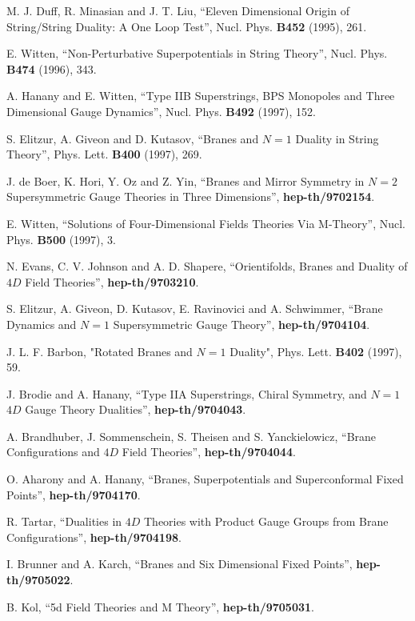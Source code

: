 \begin{thebibliography}{99}
M. J. Duff, R. Minasian and J. T. Liu, ``Eleven Dimensional
Origin of String/String Duality: A One Loop Test'', Nucl. Phys.
{\bf B452} (1995), 261.
  

 E. Witten, ``Non-Perturbative Superpotentials in String Theory'',  
Nucl. Phys. {\bf B474} (1996), 343. 

 A. Hanany and E. Witten, ``Type IIB Superstrings,
BPS Monopoles and Three Dimensional Gauge Dynamics'', Nucl. Phys.
{\bf B492} (1997), 152. 

 S. Elitzur, A. Giveon and D. Kutasov, ``Branes and
$N=1$ Duality in String Theory'', Phys. Lett. {\bf B400} (1997),
269.

 J. de Boer, K. Hori, Y. Oz and Z. Yin, ``Branes
and Mirror Symmetry in $N=2$ Supersymmetric Gauge Theories in
Three Dimensions'', {\bf hep-th/9702154}.

 E. Witten, ``Solutions of Four-Dimensional Fields
Theories Via M-Theory'', Nucl. Phys. {\bf B500} (1997), 3.

 N. Evans, C. V. Johnson and A. D. Shapere,
``Orientifolds, Branes and Duality of $4D$ Field Theories'', 
{\bf hep-th/9703210}.

 S. Elitzur, A. Giveon, D. Kutasov, E. Ravinovici
and A. Schwimmer, ``Brane Dynamics and $N=1$ Supersymmetric Gauge 
Theory'', {\bf hep-th/9704104}.

 J. L. F. Barbon, "Rotated Branes and $N=1$ 
Duality", Phys. Lett. {\bf B402} (1997), 59.

 J. Brodie and A. Hanany, ``Type IIA Superstrings, 
Chiral Symmetry, and $N=1$ $4D$ Gauge Theory Dualities'', {\bf hep-th/9704043}.

 A. Brandhuber, J. Sommenschein, S. Theisen and S.
Yanckielowicz, ``Brane Configurations and $4D$ Field Theories'', {\bf hep-th/9704044}.

 O. Aharony and A. Hanany, ``Branes, Superpotentials and 
Superconformal Fixed Points'', {\bf hep-th/9704170}.

 R. Tartar, ``Dualities in $4D$ Theories with Product Gauge Groups 
from Brane Configurations'', {\bf hep-th/9704198}.

 I. Brunner and A. Karch, ``Branes and Six Dimensional Fixed 
Points'', {\bf hep-th/9705022}.

 B. Kol, ``5d Field Theories and M Theory'', 
{\bf hep-th/9705031}.


\end{thebibliography}

